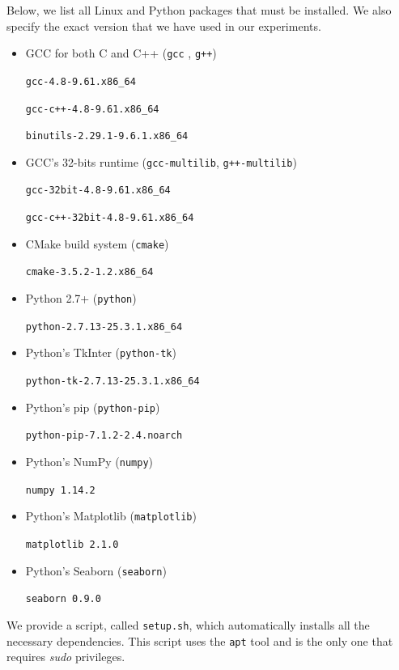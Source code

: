 \documentclass{sigplanconf}
\begin{document}
{Below, we list all Linux and Python packages that must be installed. We also specify the exact version that we have used in our experiments.

\begin{itemize}
  \item GCC for both C and C++ (\texttt{gcc} , \texttt{g++})

\texttt{gcc-4.8-9.61.x86\_64}

\texttt{gcc-c++-4.8-9.61.x86\_64}

\texttt{binutils-2.29.1-9.6.1.x86\_64}

  \item GCC's 32-bits runtime (\texttt{gcc-multilib}, \texttt{g++-multilib})

\texttt{gcc-32bit-4.8-9.61.x86\_64}

\texttt{gcc-c++-32bit-4.8-9.61.x86\_64}

  \item CMake build system (\texttt{cmake})

\texttt{cmake-3.5.2-1.2.x86\_64}

  \item Python 2.7+ (\texttt{python})

\texttt{python-2.7.13-25.3.1.x86\_64}

  \item Python's TkInter (\texttt{python-tk})

\texttt{python-tk-2.7.13-25.3.1.x86\_64}

  \item Python's pip (\texttt{python-pip})

\texttt{python-pip-7.1.2-2.4.noarch}

  \item Python's NumPy (\texttt{numpy})

\texttt{numpy 1.14.2}

  \item Python's Matplotlib (\texttt{matplotlib})

\texttt{matplotlib 2.1.0}

  \item Python's Seaborn (\texttt{seaborn})

\texttt{seaborn 0.9.0}

\end{itemize}

We provide a script, called \texttt{setup.sh}, which automatically installs
all the necessary dependencies. This script uses the \texttt{apt} tool and is the only one that requires \textit{sudo} privileges.

}
\end{document}
